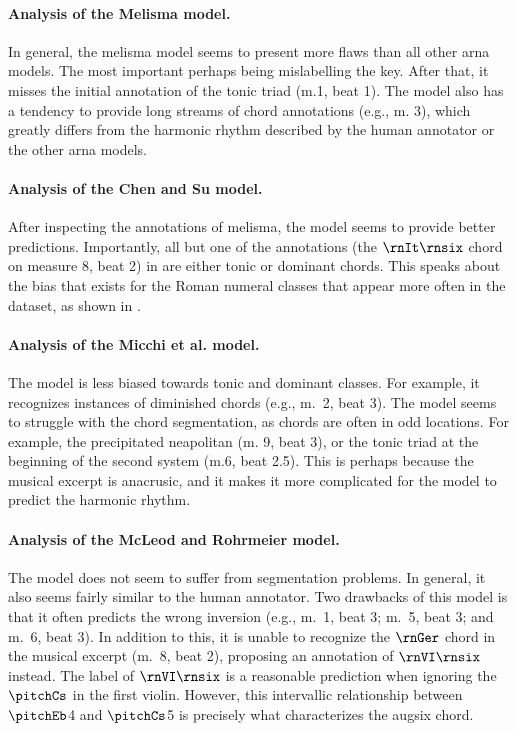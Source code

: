 \paragraph{Analysis of the Melisma model.}

In general, the \gls{melisma} model seems to present more
flaws than all other \gls{arna} models. The most important
perhaps being mislabelling the key. After that, it misses
the initial annotation of the tonic triad (m.1, beat 1). The
model also has a tendency to provide long streams of chord
annotations (e.g., m. 3), which greatly differs from the
harmonic rhythm described by the human annotator or the
other \gls{arna} models. 

\paragraph{Analysis of the Chen and Su model.}

After inspecting the annotations of \gls{melisma}, the
\textcite{chen2021attend} model seems to provide better
predictions. Importantly, all but one of the annotations
(the $\rnIt\rnsix$ chord on measure 8, beat 2) in
\textcite{chen2021attend} are either tonic or dominant
chords. This speaks about the bias that exists for the Roman
numeral classes that appear more often in the dataset, as
shown in . 

\paragraph{Analysis of the Micchi et al. model.}

The \textcite{micchi2021deep} model is less biased towards
tonic and dominant classes. For example, it recognizes
instances of diminished chords (e.g., m.~2, beat 3). The
model seems to struggle with the chord segmentation, as
chords are often in odd locations. For example, the
precipitated \gls{neapolitan} (m. 9, beat 3), or the tonic
triad at the beginning of the second system (m.6, beat 2.5).
This is perhaps because the musical excerpt is anacrusic,
and it makes it more complicated for the model to predict
the harmonic rhythm. 

\paragraph{Analysis of the McLeod and Rohrmeier model.}

The \textcite{mcleod2021modular} model does not seem to
suffer from segmentation problems. In general, it also seems
fairly similar to the human annotator. Two drawbacks of this
model is that it often predicts the wrong inversion (e.g.,
m.~1, beat 3; m.~5, beat 3; and m.~6, beat 3). In addition
to this, it is unable to recognize the $\rnGer$ chord in the
musical excerpt (m.~8, beat 2), proposing an annotation of
$\rnVI\rnsix$ instead. The label of $\rnVI\rnsix$ is a
reasonable prediction when ignoring the $\pitchCs$ in the
first violin. However, this intervallic relationship between
$\pitchEb$4 and $\pitchCs$5 is precisely what characterizes
the \gls{augsix} chord.

